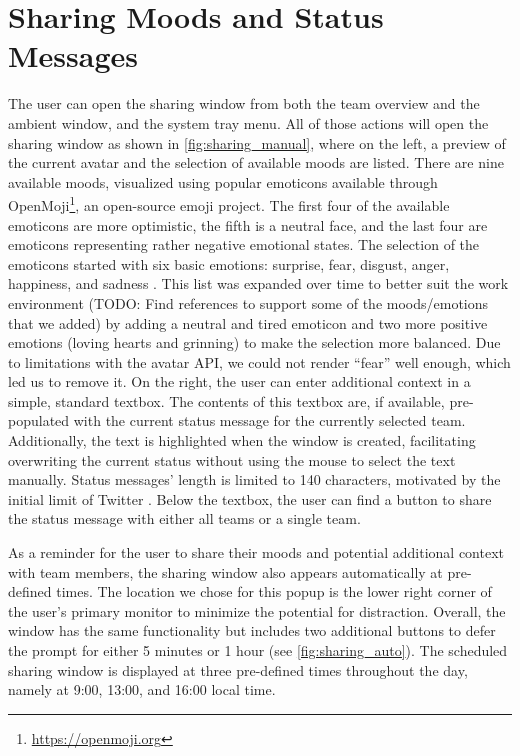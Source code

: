 \section{Sharing Moods and Status Messages}
The user can open the sharing window from both the team overview and the ambient window, and the system tray menu. All of those actions will open the sharing window as shown in \autoref{fig:sharing_manual}, where on the left, a preview of the current avatar and the selection of available moods are listed. There are nine available moods, visualized using popular emoticons available through OpenMoji\footnote{\url{https://openmoji.org}}, an open-source emoji project. The first four of the available emoticons are more optimistic, the fifth is a neutral face, and the last four are emoticons representing rather negative emotional states. The selection of the emoticons started with six basic emotions: surprise, fear, disgust, anger, happiness, and sadness \autocite{an2017two}. This list was expanded over time to better suit the work environment (TODO: Find references to support some of the moods/emotions that we added) by adding a neutral and tired emoticon and two more positive emotions (loving hearts and grinning) to make the selection more balanced. Due to limitations with the avatar API, we could not render \enquote{fear} well enough, which led us to remove it. On the right, the user can enter additional context in a simple, standard textbox. The contents of this textbox are, if available, pre-populated with the current status message for the currently selected team. Additionally, the text is highlighted when the window is created, facilitating overwriting the current status without using the mouse to select the text manually. Status messages' length is limited to 140 characters, motivated by the initial limit of Twitter \autocite{dullemond2013fixing}. Below the textbox, the user can find a button to share the status message with either all teams or a single team.

As a reminder for the user to share their moods and potential additional context with team members, the sharing window also appears automatically at pre-defined times. The location we chose for this popup is the lower right corner of the user's primary monitor to minimize the potential for distraction. Overall, the window has the same functionality but includes two additional buttons to defer the prompt for either 5 minutes or 1 hour (see \autoref{fig:sharing_auto}). The scheduled sharing window is displayed at three pre-defined times throughout the day, namely at 9:00, 13:00, and 16:00 local time.

